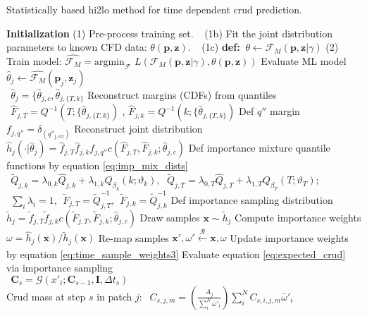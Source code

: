 \begin{algorithm}[H]
    \caption{Statistically based hi2lo method for time dependent crud prediction.}
    \begin{algorithmic}[1]
        \STATE \textbf{Initialization}
        \STATE (1) Pre-process training set.
        \STATE $\ \ $   (1b) Fit the joint distribution parameters to known CFD data: $\theta(\mathbf p, \mathbf z)$.
        \STATE $\ \ $   (1c) \textbf{def:}  $\ \theta \leftarrow \mathcal F_M(\mathbf p, \mathbf z | \gamma)$
        \STATE (2) Train model:  $\hat{\mathcal F_M} =  \mathrm{argmin}_{\mathcal F}$
        $L(\mathcal{F}_M (\mathbf p, \mathbf z| \gamma), \theta(\mathbf p, \mathbf z)) $
          \STATE Evaluate ML model $\hat \theta_j \leftarrow \hat{\mathcal F_M}(\mathbf p_j, \mathbf z_j)$ \\
          $\ \ \hat \theta_j = \{\hat \theta_{j,c}, \hat \theta_{j,\{T,k\} }$
          \STATE Reconstruct margins (CDFs) from quantiles  \\
          $\ \ \hat F_{j,T}= Q^{-1}(T; \{\hat{\theta}_{j,\{T,k\} })$ , $\hat F_{j,k}= Q^{-1}(k; \{\hat{\theta}_{j,\{T,k\} })$
          \STATE Def $q''$ margin  $f_{j,q''} = \delta_{(q''_\mathrm{j,ctf})}$
          \STATE Reconstruct joint distribution $\hat h_j(\cdot |\hat \theta_j) = \hat f_{j,T} \hat f_{j,k} f_{j,q''} c(\hat F_{j,T}, \hat F_{j,k}; \hat \theta_{j,c})$ \;
        \ENDFOR
            \STATE Def importance  mixture quantile functions by equation \ref{eq:imp_mix_dists} \\
                $\ \ \tilde Q_{j,k} = \lambda_{0,k} \hat Q_{j,k}  + \lambda_{1,k} Q_{\beta_k}(k; \vartheta_k)$,
                $\ \ \tilde Q_{j,T} = \lambda_{0,T} \hat Q_{j,T}  + \lambda_{1,T} Q_{\beta_T}(T; \vartheta_T); $ \\
                $\ \ \sum_i \lambda_i = 1, \ \ \tilde F_{j,T} = \tilde Q^{-1}_{j,T},\ \  \tilde F_{j,k} = \tilde Q^{-1}_{j,k} $
              \STATE Def importance sampling distribution $\tilde h_j = \tilde f_{j,T} \tilde f_{j,k} c(\tilde F_{j,T}, \tilde F_{j,k}; \hat \theta_{j,c}) $
              \STATE Draw samples $\mathbf x \sim \tilde h_j$ \;
              \STATE Compute importance weights $\omega = \hat h_j(\mathbf x) /  \tilde h_j(\mathbf x) $
              \STATE Re-map samples  $\mathbf x', \omega' \xleftarrow[\text{ }]{\mathcal R} \mathbf x, \omega $
              \STATE Update importance weights by equation \ref{eq:time_sample_weights3}
              \STATE Evaluate equation \ref{eq:expected_crud} via importance sampling \\
                $\ \ \mathbf C_s = \mathcal G(x'_i; \mathbf C_{s-1}, \mathbf I, \Delta t_s)$ \\
              \STATE Crud mass at step $s$ in patch $j$:
                $\ \ C_{s,j,m} = \left( \frac{A_j}{\sum_i^N \bar \omega'_i} \right) \sum_i^N C_{s,i,j,m} \bar \omega'_i$
          \ENDFOR
        \ENDFOR
        \ENDFOR
    \end{algorithmic}
    \label{algo:hi2lo_crud_algo}
\end{algorithm}

